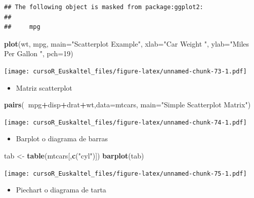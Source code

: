 \documentclass[]{book}
\newenvironment{Shaded}{\begin{snugshade}}{\end{snugshade}}
\newcommand{\KeywordTok}[1]{\textcolor[rgb]{0.13,0.29,0.53}{\textbf{#1}}}
\newcommand{\DataTypeTok}[1]{\textcolor[rgb]{0.13,0.29,0.53}{#1}}
\newcommand{\DecValTok}[1]{\textcolor[rgb]{0.00,0.00,0.81}{#1}}
\newcommand{\StringTok}[1]{\textcolor[rgb]{0.31,0.60,0.02}{#1}}
\newcommand{\OperatorTok}[1]{\textcolor[rgb]{0.81,0.36,0.00}{\textbf{#1}}}
\newcommand{\NormalTok}[1]{#1}
\providecommand{\tightlist}{%
  \setlength{\itemsep}{0pt}\setlength{\parskip}{0pt}}
\begin{document}
\begin{verbatim}
## The following object is masked from package:ggplot2:
## 
##     mpg
\end{verbatim}

\begin{Shaded}
\begin{Highlighting}[]
\KeywordTok{plot}\NormalTok{(wt, mpg, }\DataTypeTok{main=}\StringTok{"Scatterplot Example"}\NormalTok{,}
   \DataTypeTok{xlab=}\StringTok{"Car Weight "}\NormalTok{, }\DataTypeTok{ylab=}\StringTok{"Miles Per Gallon "}\NormalTok{, }\DataTypeTok{pch=}\DecValTok{19}\NormalTok{) }
\end{Highlighting}
\end{Shaded}

\texttt{[image: cursoR\_Euskaltel\_files/figure-latex/unnamed-chunk-73-1.pdf]}

\begin{itemize}
\tightlist
\item
  Matriz scatterplot
\end{itemize}

\begin{Shaded}
\begin{Highlighting}[]
\KeywordTok{pairs}\NormalTok{(}\OperatorTok{~}\NormalTok{mpg}\OperatorTok{+}\NormalTok{disp}\OperatorTok{+}\NormalTok{drat}\OperatorTok{+}\NormalTok{wt,}\DataTypeTok{data=}\NormalTok{mtcars,}
   \DataTypeTok{main=}\StringTok{"Simple Scatterplot Matrix"}\NormalTok{)}
\end{Highlighting}
\end{Shaded}

\texttt{[image: cursoR\_Euskaltel\_files/figure-latex/unnamed-chunk-74-1.pdf]}

\begin{itemize}
\tightlist
\item
  Barplot o diagrama de barras
\end{itemize}

\begin{Shaded}
\begin{Highlighting}[]
\NormalTok{tab <-}\StringTok{ }\KeywordTok{table}\NormalTok{(mtcars[,}\KeywordTok{c}\NormalTok{(}\StringTok{"cyl"}\NormalTok{)])}
\KeywordTok{barplot}\NormalTok{(tab)}
\end{Highlighting}
\end{Shaded}

\texttt{[image: cursoR\_Euskaltel\_files/figure-latex/unnamed-chunk-75-1.pdf]}

\begin{itemize}
\tightlist
\item
  Piechart o diagrama de tarta
\end{itemize}
\end{document}
